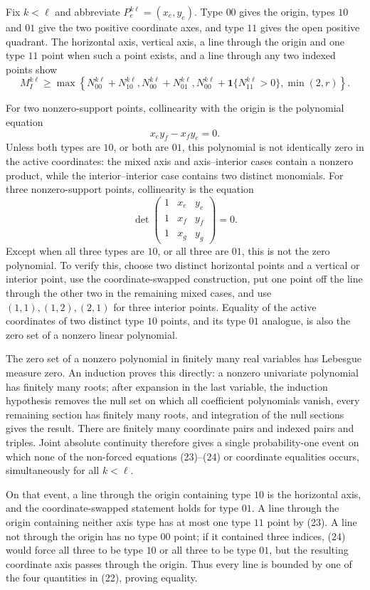 Fix \(k<\ell\) and abbreviate \(P_e^{k\ell}=(x_e,y_e)\).  Type \(00\) gives the origin, types \(10\) and \(01\) give the two positive coordinate axes, and type \(11\) gives the open positive quadrant.  The horizontal axis, vertical axis, a line through the origin and one type \(11\) point when such a point exists, and a line through any two indexed points show
\[
 M_I^{k\ell}\ge
 \max\!\left\{
 N_{00}^{k\ell}+N_{10}^{k\ell},
 N_{00}^{k\ell}+N_{01}^{k\ell},
 N_{00}^{k\ell}+\mathbf 1\{N_{11}^{k\ell}>0\},
 \min(2,r)
 \right\}. \tag{22}
\]

For two nonzero-support points, collinearity with the origin is the polynomial equation
\[
 x_ey_f-x_fy_e=0. \tag{23}
\]
Unless both types are \(10\), or both are \(01\), this polynomial is not identically zero in the active coordinates: the mixed axis and axis--interior cases contain a nonzero product, while the interior--interior case contains two distinct monomials.  For three nonzero-support points, collinearity is the equation
\[
 \det\!\begin{pmatrix}
 1&x_e&y_e\\
 1&x_f&y_f\\
 1&x_g&y_g
 \end{pmatrix}=0. \tag{24}
\]
Except when all three types are \(10\), or all three are \(01\), this is not the zero polynomial.  To verify this, choose two distinct horizontal points and a vertical or interior point, use the coordinate-swapped construction, put one point off the line through the other two in the remaining mixed cases, and use \((1,1),(1,2),(2,1)\) for three interior points.  Equality of the active coordinates of two distinct type \(10\) points, and its type \(01\) analogue, is also the zero set of a nonzero linear polynomial.

The zero set of a nonzero polynomial in finitely many real variables has Lebesgue measure zero.  An induction proves this directly: a nonzero univariate polynomial has finitely many roots; after expansion in the last variable, the induction hypothesis removes the null set on which all coefficient polynomials vanish, every remaining section has finitely many roots, and integration of the null sections gives the result.  There are finitely many coordinate pairs and indexed pairs and triples.  Joint absolute continuity therefore gives a single probability-one event on which none of the non-forced equations (23)--(24) or coordinate equalities occurs, simultaneously for all \(k<\ell\).

On that event, a line through the origin containing type \(10\) is the horizontal axis, and the coordinate-swapped statement holds for type \(01\).  A line through the origin containing neither axis type has at most one type \(11\) point by (23).  A line not through the origin has no type \(00\) point; if it contained three indices, (24) would force all three to be type \(10\) or all three to be type \(01\), but the resulting coordinate axis passes through the origin.  Thus every line is bounded by one of the four quantities in (22), proving equality.